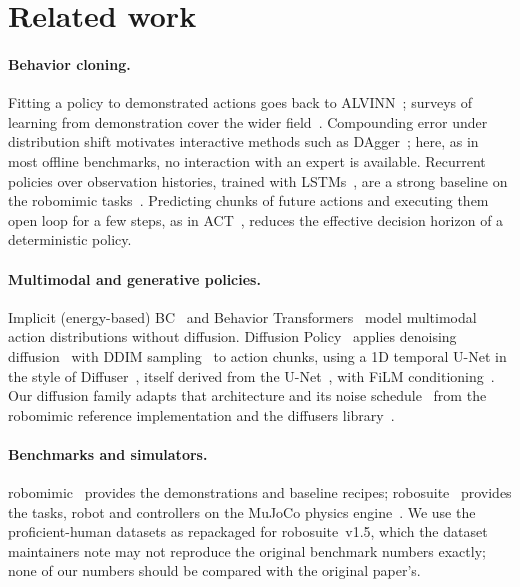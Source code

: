 \section{Related work}
\label{sec:related}

\paragraph{Behavior cloning.} Fitting a policy to demonstrated actions goes back to
ALVINN~\citep{pomerleau1991}; surveys of learning from demonstration cover the wider
field~\citep{argall2009survey}. Compounding error under distribution shift motivates
interactive methods such as DAgger~\citep{ross2011dagger}; here, as in most offline
benchmarks, no interaction with an expert is available. Recurrent policies over observation
histories, trained with LSTMs~\citep{hochreiter1997lstm}, are a strong baseline on the
robomimic tasks~\citep{mandlekar2021robomimic}. Predicting chunks of future actions and
executing them open loop for a few steps, as in ACT~\citep{zhao2023act}, reduces the
effective decision horizon of a deterministic policy.

\paragraph{Multimodal and generative policies.} Implicit (energy-based)
BC~\citep{florence2021ibc} and Behavior Transformers~\citep{shafiullah2022bet} model
multimodal action distributions without diffusion. Diffusion Policy~\citep{chi2023diffusion}
applies denoising diffusion~\citep{ho2020ddpm} with DDIM sampling~\citep{song2021ddim} to
action chunks, using a 1D temporal U-Net in the style of Diffuser~\citep{janner2022diffuser},
itself derived from the U-Net~\citep{ronneberger2015unet}, with FiLM
conditioning~\citep{perez2018film}. Our diffusion family adapts that architecture and its
noise schedule~\citep{nichol2021improved} from the robomimic reference implementation and
the diffusers library~\citep{diffusers}.

\paragraph{Benchmarks and simulators.} robomimic~\citep{mandlekar2021robomimic} provides the
demonstrations and baseline recipes; robosuite~\citep{zhu2020robosuite} provides the tasks,
robot and controllers on the MuJoCo physics engine~\citep{todorov2012mujoco}. We use the
proficient-human datasets as repackaged for robosuite~v1.5, which the dataset maintainers
note may not reproduce the original benchmark numbers exactly; none of our numbers should
be compared with the original paper's.

